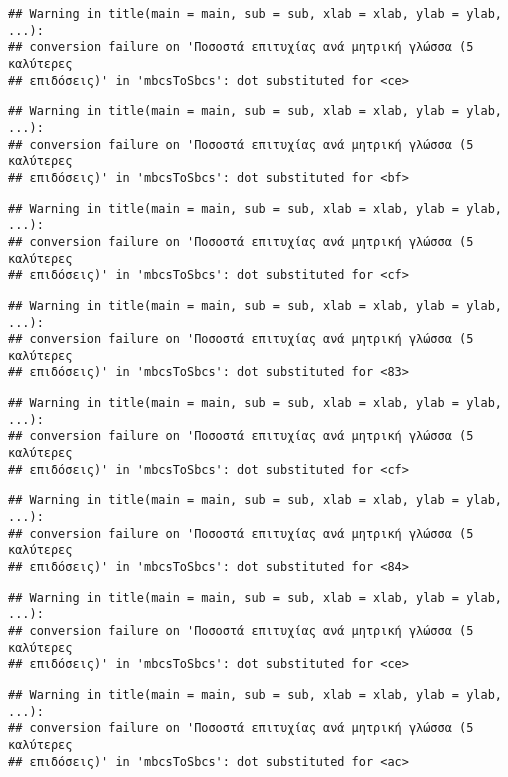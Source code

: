 \documentclass[
]{article}
\begin{document}
\begin{verbatim}
## Warning in title(main = main, sub = sub, xlab = xlab, ylab = ylab, ...):
## conversion failure on 'Ποσοστά επιτυχίας ανά μητρική γλώσσα (5 καλύτερες
## επιδόσεις)' in 'mbcsToSbcs': dot substituted for <ce>
\end{verbatim}

\begin{verbatim}
## Warning in title(main = main, sub = sub, xlab = xlab, ylab = ylab, ...):
## conversion failure on 'Ποσοστά επιτυχίας ανά μητρική γλώσσα (5 καλύτερες
## επιδόσεις)' in 'mbcsToSbcs': dot substituted for <bf>
\end{verbatim}

\begin{verbatim}
## Warning in title(main = main, sub = sub, xlab = xlab, ylab = ylab, ...):
## conversion failure on 'Ποσοστά επιτυχίας ανά μητρική γλώσσα (5 καλύτερες
## επιδόσεις)' in 'mbcsToSbcs': dot substituted for <cf>
\end{verbatim}

\begin{verbatim}
## Warning in title(main = main, sub = sub, xlab = xlab, ylab = ylab, ...):
## conversion failure on 'Ποσοστά επιτυχίας ανά μητρική γλώσσα (5 καλύτερες
## επιδόσεις)' in 'mbcsToSbcs': dot substituted for <83>
\end{verbatim}

\begin{verbatim}
## Warning in title(main = main, sub = sub, xlab = xlab, ylab = ylab, ...):
## conversion failure on 'Ποσοστά επιτυχίας ανά μητρική γλώσσα (5 καλύτερες
## επιδόσεις)' in 'mbcsToSbcs': dot substituted for <cf>
\end{verbatim}

\begin{verbatim}
## Warning in title(main = main, sub = sub, xlab = xlab, ylab = ylab, ...):
## conversion failure on 'Ποσοστά επιτυχίας ανά μητρική γλώσσα (5 καλύτερες
## επιδόσεις)' in 'mbcsToSbcs': dot substituted for <84>
\end{verbatim}

\begin{verbatim}
## Warning in title(main = main, sub = sub, xlab = xlab, ylab = ylab, ...):
## conversion failure on 'Ποσοστά επιτυχίας ανά μητρική γλώσσα (5 καλύτερες
## επιδόσεις)' in 'mbcsToSbcs': dot substituted for <ce>
\end{verbatim}

\begin{verbatim}
## Warning in title(main = main, sub = sub, xlab = xlab, ylab = ylab, ...):
## conversion failure on 'Ποσοστά επιτυχίας ανά μητρική γλώσσα (5 καλύτερες
## επιδόσεις)' in 'mbcsToSbcs': dot substituted for <ac>
\end{verbatim}
\end{document}

